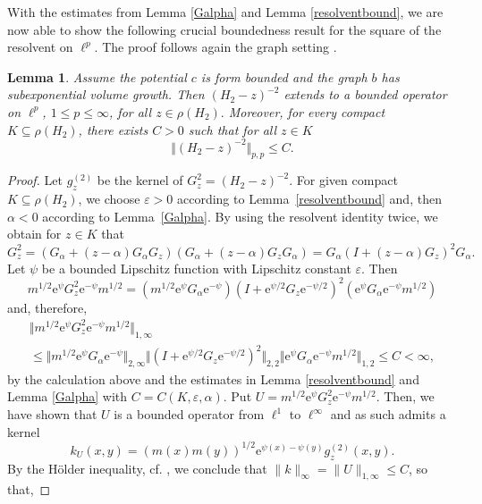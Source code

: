 \documentclass[10pt]{amsart}
\newtheorem{lemma}[theorem]{Lemma}
\theoremstyle{definition}
\begin{document}
With the estimates from Lemma \ref{Galpha} and Lemma \ref{resolventbound}, we are now able to show the following crucial boundedness result for the square of the resolvent on $\ell^p.$ The proof follows again the graph setting \cite[Lemma~4.3]{BauerHuaKeller}.

\begin{lemma}\label{lp2bounded}
   Assume the potential $c$ is form bounded and the graph $b$ has subexponential volume growth. Then $( H_2-z)^{-2}$ extends to a bounded operator on $\ell^p$, $1\leq p\leq\infty$, for all $z\in\rho( H_2).$ Moreover, for every compact $K\subseteq\rho( H_2)$, there exists $C>0$ such that for all $z\in K$
    \[\Vert ( H_2-z)^{-2}\Vert_{p,p}\leq C.\]
\end{lemma}

\begin{proof}
     Let $g_z^{(2)}$ be the kernel of $G_z^2 = ( H_2-z)^{-2}.$ 
     For given compact $K\subseteq\rho( H_2)$, we choose $\varepsilon>0$ 
     according to Lemma~\ref{resolventbound} and, then $\alpha<0$ according to Lemma~\ref{Galpha}. By using the resolvent identity twice, we obtain for $z\in K$ that
    \[G_z^2 = (G_\alpha+(z-\alpha)G_\alpha G_z)(G_\alpha+(z-\alpha)G_zG_\alpha) = G_\alpha(I+(z-\alpha)G_z)^2G_\alpha.\]
    Let $\psi$ be a bounded Lipschitz function with Lipschitz constant $\varepsilon.$ Then
    \[m^{1\slash 2}\mathrm{e}^\psi G_z^2\mathrm{e}^{-\psi}m^{1\slash 2} = (m^{1\slash 2}\mathrm{e}^\psi G_\alpha\mathrm{e}^{-\psi})(I+\mathrm{e}^{\psi\slash 2} G_z\mathrm{e}^{-\psi\slash 2})^2(\mathrm{e}^\psi G_\alpha\mathrm{e}^{-\psi}m^{1\slash 2})\] and, therefore,
    \begin{multline*}
       \Vert m^{1\slash 2}\mathrm{e}^\psi G_z^2\mathrm{e}^{-\psi}m^{1\slash 2}\Vert_{1,\infty}
       \\\leq \Vert m^{1\slash 2}\mathrm{e}^\psi G_\alpha\mathrm{e}^{-\psi}\Vert_{2,\infty}\Vert (I+\mathrm{e}^{\psi\slash 2} G_z\mathrm{e}^{-\psi\slash 2})^2\Vert_{2,2}\Vert\mathrm{e}^\psi G_\alpha\mathrm{e}^{-\psi}m^{1\slash 2}\Vert_{1,2}\le C<\infty,
    \end{multline*}
    by the calculation above and the estimates in Lemma \ref{resolventbound} and Lemma \ref{Galpha} with $C=C(K,\varepsilon,\alpha)$. Put $U = m^{1\slash 2}\mathrm{e}^\psi G_z^2\mathrm{e}^{-\psi}m^{1\slash 2}.$ Then, we have shown that $U$ is a bounded operator from $\ell^1$ to $\ell^\infty$ and as such admits a kernel \[k_U(x,y) = (m(x)m(y))^{1\slash 2}\mathrm{e}^{\psi(x)-\psi(y)}g_z^{(2)}(x,y).\] By the  Hölder inequality, cf. \cite[Lemma 3.5 (b)]{BauerHuaKeller}, we conclude that $ \|k\|_\infty=\|U\|_{1,\infty}\leq C $, so that,    

\end{proof}
\end{document}
